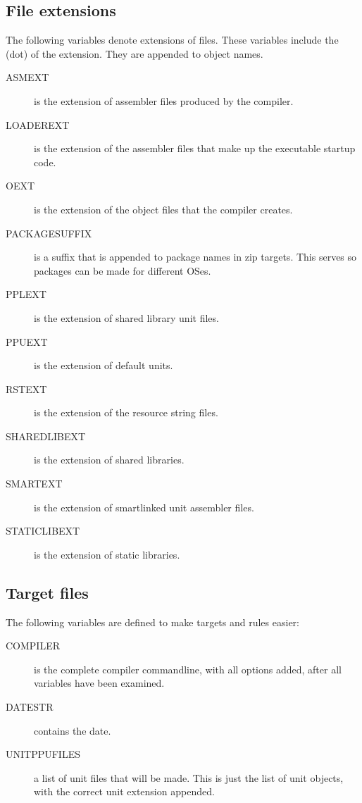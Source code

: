 {\subsection{File extensions}

The following variables denote extensions of files. These variables include
the  (dot) of the extension. They are appended to object names.

\begin{description}
\item[ASMEXT] is the extension of assembler files produced by the compiler.
\item[LOADEREXT] is the extension of the assembler files that make up the
executable startup code.
\item[OEXT] is the extension of the  object files that the compiler creates.
\item[PACKAGESUFFIX] is a suffix that is appended to package names in zip
targets. This serves so packages can be made for different OSes.
\item[PPLEXT] is the extension of shared library unit files.
\item[PPUEXT] is the extension of default units.
\item[RSTEXT] is the extension of the  resource string files.
\item[SHAREDLIBEXT] is the extension of shared libraries.
\item[SMARTEXT] is the extension of smartlinked unit assembler files.
\item[STATICLIBEXT] is the extension of static libraries.
\end{description}

\subsection{Target files}

The following variables are defined to make targets and rules easier:
\begin{description}
\item[COMPILER] is the complete compiler commandline, with all options
added, after all  variables have been examined.
\item[DATESTR] contains the date.
\item[UNITPPUFILES] a list of unit files that will be made. This is just
the list of unit objects, with the correct unit extension appended.
\end{description}

}

